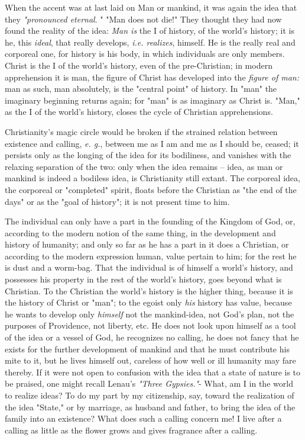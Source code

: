 \documentclass[a4paper]{book}
\begin{document}
When the accent was at last laid on Man or mankind, it was again the idea that 
they \textit{"{}pronounced eternal}. "{} "{}Man does not die!"{} They thought 
they had now found the reality of the idea: \textit{Man is} the I of history, 
of the world's history; it is he, this \textit{ideal}, that really develops, 
\textit{i.e. realizes}, himself. He is the really real and corporeal one, for 
history is his body, in which individuals are only members. Christ is the I of 
the world's history, even of the pre-Christian; in modern apprehension it is 
man, the figure of Christ has developed into the \textit{figure of man:} man 
as such, man absolutely, is the "{}central point"{} of history. In "{}man"{} 
the imaginary beginning returns again; for "{}man"{} is as imaginary as Christ 
is. "{}Man,"{} as the I of the world's history, closes the cycle of Christian 
apprehensions.

Christianity's magic circle would be broken if the strained relation between 
existence and calling, \textit{e. g.}, between me as I am and me as I should 
be, ceased; it persists only as the longing of the idea for its bodiliness, 
and vanishes with the relaxing separation of the two: only when the idea 
remains -- idea, as man or mankind is indeed a bodiless idea, is Christianity 
still extant. The corporeal idea, the corporeal or "{}completed"{} spirit, 
floats before the Christian as "{}the end of the days"{} or as the "{}goal of 
history"{}; it is not present time to him.

The individual can only have a part in the founding of the Kingdom of God, or, 
according to the modern notion of the same thing, in the development and 
history of humanity; and only so far as he has a part in it does a Christian, 
or according to the modern expression human, value pertain to him; for the 
rest he is dust and a worm-bag. That the individual is of himself a world's 
history, and possesses his property in the rest of the world's history, goes 
beyond what is Christian. To the Christian the world's history is the higher 
thing, because it is the history of Christ or "{}man"{}; to the egoist only 
\textit{his} history has value, because he wants to develop only 
\textit{himself} not the mankind-idea, not God's plan, not the purposes of 
Providence, not liberty, etc. He does not look upon himself as a tool of the 
idea or a vessel of God, he recognizes no calling, he does not fancy that he 
exists for the further development of mankind and that he must contribute his 
mite to it, but he lives himself out, careless of how well or ill humanity may 
fare thereby. If it were not open to confusion with the idea that a state of 
nature is to be praised, one might recall Lenau's \textit{"{}Three 
Gypsies."{}}- What, am I in the world to realize ideas? To do my part by my 
citizenship, say, toward the realization of the idea "{}State,"{} or by 
marriage, as husband and father, to bring the idea of the family into an 
existence? What does such a calling concern me! I live after a calling as 
little as the flower grows and gives fragrance after a calling.
\end{document}
